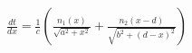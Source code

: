 \documentclass[preview]{standalone}
\begin{document}
\begin{align*}
\frac{dt}{dx} = \frac{1}{c}(\frac{n_1(x)}{\sqrt{a^2+x^2}} + \frac{n_2(x-d)}{\sqrt{b^2 + (d-x)^2}})
\end{align*}
\end{document}
